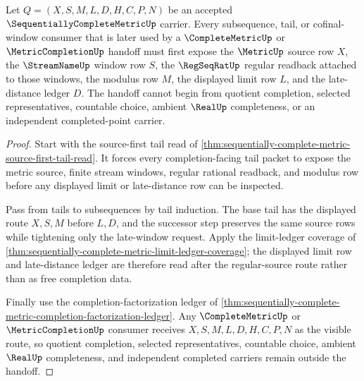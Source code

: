 \begin{theorem}
\label{thm:sequentially-complete-metric-source-first-subsequence-read}
Let $Q=(X,S,M,L,D,H,C,P,N)$ be an accepted $\SequentiallyCompleteMetricUp$ carrier. Every subsequence, tail, or cofinal-window consumer that is later used by a $\CompleteMetricUp$ or $\MetricCompletionUp$ handoff must first expose the $\MetricUp$ source row $X$, the $\StreamNameUp$ window row $S$, the $\RegSeqRatUp$ regular readback attached to those windows, the modulus row $M$, the displayed limit row $L$, and the late-distance ledger $D$. The handoff cannot begin from quotient completion, selected representatives, countable choice, ambient $\RealUp$ completeness, or an independent completed-point carrier.
\end{theorem}
\begin{proof}
Start with the source-first tail read of \autoref{thm:sequentially-complete-metric-source-first-tail-read}. It forces every completion-facing tail packet to expose the metric source, finite stream windows, regular rational readback, and modulus row before any displayed limit or late-distance row can be inspected.

Pass from tails to subsequences by tail induction. The base tail has the displayed route $X,S,M$ before $L,D$, and the successor step preserves the same source rows while tightening only the late-window request. Apply the limit-ledger coverage of \autoref{thm:sequentially-complete-metric-limit-ledger-coverage}; the displayed limit row and late-distance ledger are therefore read after the regular-source route rather than as free completion data.

Finally use the completion-factorization ledger of \autoref{thm:sequentially-complete-metric-completion-factorization-ledger}. Any $\CompleteMetricUp$ or $\MetricCompletionUp$ consumer receives $X,S,M,L,D,H,C,P,N$ as the visible route, so quotient completion, selected representatives, countable choice, ambient $\RealUp$ completeness, and independent completed carriers remain outside the handoff.
\end{proof}


